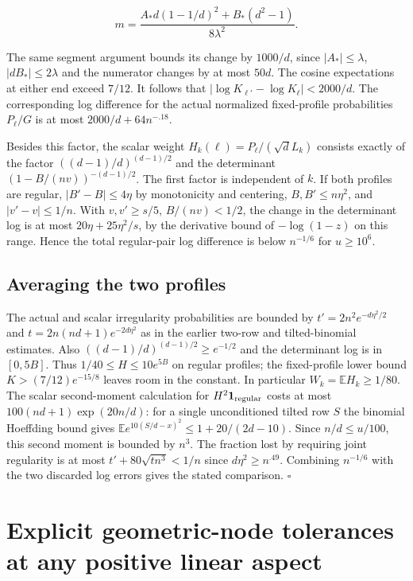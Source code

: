 \documentclass[11pt]{article}
\begin{document}
\[
m=\frac{A_{\ast}d(1-1/d)^2+B_{\ast}(d^2-1)}{8\lambda^2} .
\]

The same segment argument bounds its change by $1000/d$, since $|A_{\ast}|\le\lambda$, $|dB_{\ast}|\le2\lambda$ and the numerator changes by at most $50d$. The cosine expectations at either end exceed $7/12$. It follows that $|\log K_{\ell'}-\log K_{\ell}|<2000/d$. The corresponding log difference for the actual normalized fixed-profile probabilities $P_\ell/G$ is at most $2000/d+64n^{-.18}$.

Besides this factor, the scalar weight $H_k(\ell)=P_\ell/(\sqrt d L_k)$ consists exactly of the factor $((d-1)/d)^{(d-1)/2}$ and the determinant $(1-B/(nv))^{-(d-1)/2}$. The first factor is independent of $k$. If both profiles are regular, $|B'-B|\le4\eta$ by monotonicity and centering, $B,B'\le n\eta^2$, and $|v'-v|\le1/n$. With $v,v'\ge s/5$, $B/(nv)<1/2$, the change in the determinant log is at most $20\eta+25\eta^2/s$, by the derivative bound of $-\log(1-z)$ on this range. Hence the total regular-pair log difference is below $n^{-1/6}$ for $u\ge10^6$.

\subsection{Averaging the two profiles}

The actual and scalar irregularity probabilities are bounded by $t'=2n^2e^{-d\eta^2/2}$ and $t=2n(nd+1)e^{-2d\eta^2}$ as in the earlier two-row and tilted-binomial estimates. Also $((d-1)/d)^{(d-1)/2}\ge e^{-1/2}$ and the determinant log is in $[0,5B]$. Thus $1/40\le H\le10e^{5B}$ on regular profiles; the fixed-profile lower bound $K> (7/12)e^{-15/8}$ leaves room in the constant. In particular $W_k=\mathbb EH_k\ge1/80$. The scalar second-moment calculation for $H^2\mathbf1_{\rm regular}$ costs at most $100(nd+1)\exp(20 n/d)$: for a single unconditioned tilted row $S$ the binomial Hoeffding bound gives $\mathbb E e^{10(S/d-x)^2}\le1+20/(2d-10)$. Since $n/d\le u/100$, this second moment is bounded by $n^3$. The fraction lost by requiring joint regularity is at most $t'+80\sqrt{tn^3}<1/n$ since $d\eta^2\ge n^{.49}$. Combining $n^{-1/6}$ with the two discarded log errors gives the stated comparison. $\square$

\section{Explicit geometric-node tolerances at any positive linear aspect}
\end{document}
